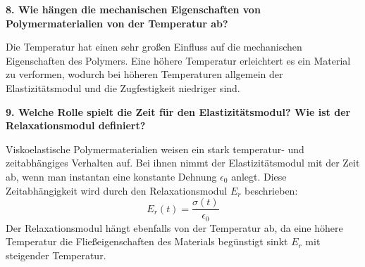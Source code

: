 \noindent\textbf{8. Wie hängen die mechanischen Eigenschaften von Polymermaterialien von der Temperatur ab?}\\
\begin{addmargin}[25pt]{0pt}
Die Temperatur hat einen sehr großen Einfluss auf die mechanischen Eigenschaften des Polymers. Eine höhere Temperatur erleichtert es ein Material zu verformen, wodurch bei höheren Temperaturen allgemein der Elastizitätsmodul und die Zugfestigkeit niedriger sind. \\
\end{addmargin}

\noindent\textbf{9. Welche Rolle spielt die Zeit für den Elastizitätsmodul? Wie ist der Relaxationsmodul definiert?}\\
\begin{addmargin}[25pt]{0pt}
Viskoelastische Polymermaterialien weisen ein stark temperatur- und zeitabhängiges Verhalten auf. Bei ihnen nimmt der Elastizitätsmodul mit der Zeit ab, wenn man instantan eine konstante Dehnung $\epsilon_0$ anlegt. Diese Zeitabhängigkeit wird durch den Relaxationsmodul $E_r$ beschrieben:
\begin{equation}\label{eq:Relaxationsmodul}
    E_r(t) = \frac{\sigma (t)}{\epsilon_0}
\end{equation}
Der Relaxationsmodul hängt ebenfalls von der Temperatur ab, da eine höhere Temperatur die Fließeigenschaften des Materials begünstigt sinkt $E_r$ mit steigender Temperatur.\\
\end{addmargin}

